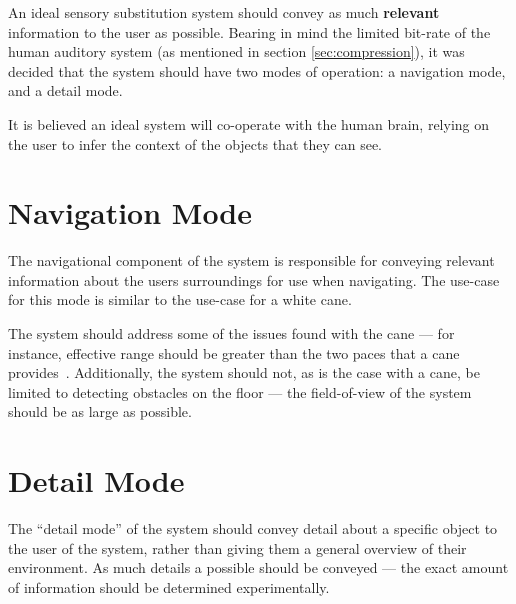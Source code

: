 An ideal sensory substitution system should convey as much \textbf{relevant} information to the user as possible. Bearing in mind the limited bit-rate of the human auditory system (as mentioned in section \ref{sec:compression}), it was decided that the system should have two modes of operation: a navigation mode, and a detail mode.

It is believed an ideal system will co-operate with the human brain, relying on the user to infer the context of the objects that they can see.

\section{Navigation Mode}
The navigational component of the system is responsible for conveying relevant information about the users surroundings for use when navigating. The use-case for this mode is similar to the use-case for a white cane.

The system should address some of the issues found with the cane --- for instance, effective range should be greater than the two paces that a cane provides~\cite{mobilityenhancement}. Additionally, the system should not, as is the case with a cane, be limited to detecting obstacles on the floor --- the field-of-view of the system should be as large as possible.

\section{Detail Mode}
The ``detail mode'' of the system should convey detail about a specific object to the user of the system, rather than giving them a general overview of their environment. As much details a possible should be conveyed --- the exact amount of information should be determined experimentally. 
